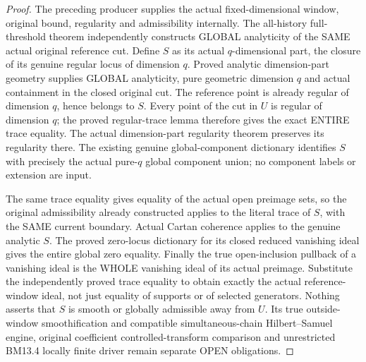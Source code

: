 \begin{proof}
The preceding producer supplies the actual fixed-dimensional window,
original bound, regularity and admissibility internally. The all-history
full-threshold theorem independently constructs GLOBAL analyticity of the
SAME actual original reference cut. Define $S$ as its actual $q$-dimensional
part, the closure of its genuine regular locus of dimension $q$. Proved
analytic dimension-part geometry supplies GLOBAL analyticity, pure
geometric dimension $q$ and actual containment in the closed original cut.
The reference point is already regular of dimension $q$, hence belongs
to $S$. Every point of the cut in $U$ is regular of dimension $q$; the
proved regular-trace lemma therefore gives the exact ENTIRE trace equality.
The actual dimension-part regularity theorem preserves its regularity
there. The existing genuine global-component dictionary identifies $S$
with precisely the actual pure-$q$ global component union; no component
labels or extension are input.

The same trace equality gives equality of the actual open preimage sets,
so the original admissibility already constructed applies to the literal
trace of $S$, with the SAME current boundary. Actual Cartan coherence
applies to the genuine analytic $S$. The proved zero-locus dictionary for
its closed reduced vanishing ideal gives the entire global zero equality.
Finally the true open-inclusion pullback of a vanishing ideal is the WHOLE
vanishing ideal of its actual preimage. Substitute the independently proved
trace equality to obtain exactly the actual reference-window ideal, not
just equality of supports or of selected generators. Nothing asserts that
$S$ is smooth or globally admissible away from $U$. Its true outside-window
smoothification and compatible simultaneous-chain Hilbert--Samuel engine,
original coefficient controlled-transform comparison and unrestricted
BM13.4 locally finite driver remain separate OPEN obligations.
\end{proof}
